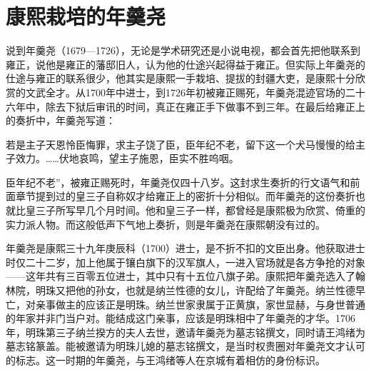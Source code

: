 \begin{sectionnotes}






\end{sectionnotes}
\section{康熙栽培的年羹尧}


说到年羹尧（1679—1726），无论是学术研究还是小说电视，都会首先把他联系到雍正，说他是雍正的藩邸旧人，认为他的仕途兴起得益于雍正。但实际上年羹尧的仕途与雍正的联系很少，他其实是康熙一手栽培、提拔的封疆大吏，是康熙十分欣赏的文武全才。从1700年中进士，到1726年初被雍正赐死，年羹尧混迹官场的二十六年中，除去下狱后审讯的时间，真正在雍正手下做事不到三年。在最后给雍正上的奏折中，年羹尧写道：



\begin{bookquote}若是主子天恩怜臣悔罪，求主子饶了臣，臣年纪不老，留下这一个犬马慢慢的给主子效力。……伏地哀鸣，望主子施恩，臣实不胜呜咽。\end{bookquote}


臣年纪不老”，被雍正赐死时，年羹尧仅四十八岁。这封求生奏折的行文语气和前面章节提到过的皇三子自称奴才给雍正上的密折十分相似。而年羹尧的这份奏折也就比皇三子所写早几个月时间。他和皇三子一样，都曾经是康熙极为欣赏、倚重的实力派人物。而这般低声下气地上奏折，则是年羹尧在康熙朝没有过的。



年羹尧是康熙三十九年庚辰科（1700）进士，是不折不扣的文臣出身。他获取进士时仅二十二岁，加上他属于镶白旗下的汉军旗人，一进入官场就是各方争抢的对象——这年共有三百零五位进士，其中只有十五位八旗子弟。康熙把年羹尧选入了翰林院，明珠又把他的孙女，也就是纳兰性德的女儿，许配给了年羹尧。纳兰性德早亡，对亲事做主的应该正是明珠。纳兰世家隶属于正黄旗，家世显赫，与身世普通的年家并非门当户对。能结成这门亲事，应该是明珠相中了年羹尧的才华。1706年，明珠第三子纳兰揆方的夫人去世，邀请年羹尧为墓志铭撰文，同时请王鸿绪为墓志铭篆盖。能被邀请为明珠儿媳的墓志铭撰文，是当时权贵圈对年羹尧文才认可的标志。这一时期的年羹尧，与王鸿绪等人在京城有着相仿的身份标识。


